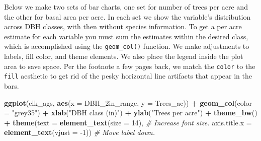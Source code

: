 \documentclass[
  11pt,
]{krantz}
\newenvironment{Shaded}{\begin{snugshade}}{\end{snugshade}}
\newcommand{\CommentTok}[1]{\textcolor[rgb]{0.56,0.35,0.01}{\textit{#1}}}
\newcommand{\DataTypeTok}[1]{\textcolor[rgb]{0.13,0.29,0.53}{#1}}
\newcommand{\DecValTok}[1]{\textcolor[rgb]{0.00,0.00,0.81}{#1}}
\newcommand{\KeywordTok}[1]{\textcolor[rgb]{0.13,0.29,0.53}{\textbf{#1}}}
\newcommand{\NormalTok}[1]{#1}
\newcommand{\OperatorTok}[1]{\textcolor[rgb]{0.81,0.36,0.00}{\textbf{#1}}}
\newcommand{\StringTok}[1]{\textcolor[rgb]{0.31,0.60,0.02}{#1}}
\theoremstyle{definition}
\theoremstyle{definition}
\theoremstyle{definition}
\theoremstyle{definition}
\theoremstyle{remark}
\begin{document}
Below we make two sets of bar charts, one set for number of trees per acre and the other for basal area per acre. In each set we show the variable's distribution across DBH classes, with then without species information. To get a per acre estimate for each variable you must sum the estimates within the desired class, which is accomplished using the \texttt{geom\_col()} function. We make adjustments to labels, fill color, and theme elements. We also place the legend inside the plot area to save space. Per the footnote a few pages back, we match the \texttt{color} to the \texttt{fill} aesthetic to get rid of the pesky horizontal line artifacts that appear in the bars.

\begin{Shaded}
\begin{Highlighting}[]
\KeywordTok{ggplot}\NormalTok{(elk\_ags, }\KeywordTok{aes}\NormalTok{(}\DataTypeTok{x =}\NormalTok{ DBH\_2in\_range, }\DataTypeTok{y =}\NormalTok{ Trees\_ac)) }\OperatorTok{+}
\StringTok{  }\KeywordTok{geom\_col}\NormalTok{(}\DataTypeTok{color =} \StringTok{"grey35"}\NormalTok{) }\OperatorTok{+}\StringTok{ }
\StringTok{  }\KeywordTok{xlab}\NormalTok{(}\StringTok{"DBH class (in)"}\NormalTok{) }\OperatorTok{+}\StringTok{ }
\StringTok{  }\KeywordTok{ylab}\NormalTok{(}\StringTok{"Trees per acre"}\NormalTok{) }\OperatorTok{+}
\StringTok{  }\KeywordTok{theme\_bw}\NormalTok{() }\OperatorTok{+}\StringTok{ }
\StringTok{  }\KeywordTok{theme}\NormalTok{(}\DataTypeTok{text =} \KeywordTok{element\_text}\NormalTok{(}\DataTypeTok{size =} \DecValTok{14}\NormalTok{), }\CommentTok{\# Increase font size.}
        \DataTypeTok{axis.title.x =} \KeywordTok{element\_text}\NormalTok{(}\DataTypeTok{vjust =} \DecValTok{{-}1}\NormalTok{)) }\CommentTok{\# Move label down.}


\end{Highlighting}
\end{Shaded}
\end{document}
